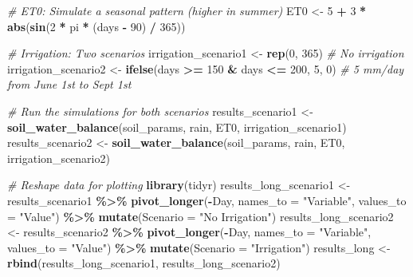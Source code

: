 \documentclass[
]{book}
\newenvironment{Shaded}{\begin{snugshade}}{\end{snugshade}}
\newcommand{\AttributeTok}[1]{\textcolor[rgb]{0.13,0.29,0.53}{#1}}
\newcommand{\CommentTok}[1]{\textcolor[rgb]{0.56,0.35,0.01}{\textit{#1}}}
\newcommand{\DecValTok}[1]{\textcolor[rgb]{0.00,0.00,0.81}{#1}}
\newcommand{\FunctionTok}[1]{\textcolor[rgb]{0.13,0.29,0.53}{\textbf{#1}}}
\newcommand{\NormalTok}[1]{#1}
\newcommand{\OtherTok}[1]{\textcolor[rgb]{0.56,0.35,0.01}{#1}}
\newcommand{\SpecialCharTok}[1]{\textcolor[rgb]{0.81,0.36,0.00}{\textbf{#1}}}
\newcommand{\StringTok}[1]{\textcolor[rgb]{0.31,0.60,0.02}{#1}}
\theoremstyle{definition}
\theoremstyle{definition}
\theoremstyle{definition}
\theoremstyle{definition}
\theoremstyle{remark}
\begin{document}
\begin{Shaded}
\begin{Highlighting}[]
\CommentTok{\# ET0: Simulate a seasonal pattern (higher in summer)}
\NormalTok{ET0 }\OtherTok{\textless{}{-}} \DecValTok{5} \SpecialCharTok{+} \DecValTok{3} \SpecialCharTok{*} \FunctionTok{abs}\NormalTok{(}\FunctionTok{sin}\NormalTok{(}\DecValTok{2} \SpecialCharTok{*}\NormalTok{ pi }\SpecialCharTok{*}\NormalTok{ (days }\SpecialCharTok{{-}} \DecValTok{90}\NormalTok{) }\SpecialCharTok{/} \DecValTok{365}\NormalTok{)) }

\CommentTok{\# Irrigation: Two scenarios}
\NormalTok{irrigation\_scenario1 }\OtherTok{\textless{}{-}} \FunctionTok{rep}\NormalTok{(}\DecValTok{0}\NormalTok{, }\DecValTok{365}\NormalTok{)  }\CommentTok{\# No irrigation}
\NormalTok{irrigation\_scenario2 }\OtherTok{\textless{}{-}} \FunctionTok{ifelse}\NormalTok{(days }\SpecialCharTok{\textgreater{}=} \DecValTok{150} \SpecialCharTok{\&}\NormalTok{ days }\SpecialCharTok{\textless{}=} \DecValTok{200}\NormalTok{, }\DecValTok{5}\NormalTok{, }\DecValTok{0}\NormalTok{)  }\CommentTok{\# 5 mm/day from June 1st to Sept 1st}

\CommentTok{\# Run the simulations for both scenarios}
\NormalTok{results\_scenario1 }\OtherTok{\textless{}{-}} \FunctionTok{soil\_water\_balance}\NormalTok{(soil\_params, rain, ET0, irrigation\_scenario1)}
\NormalTok{results\_scenario2 }\OtherTok{\textless{}{-}} \FunctionTok{soil\_water\_balance}\NormalTok{(soil\_params, rain, ET0, irrigation\_scenario2)}
\end{Highlighting}
\end{Shaded}

\begin{Shaded}
\begin{Highlighting}[]
\CommentTok{\# Reshape data for plotting}
\FunctionTok{library}\NormalTok{(tidyr)}
\NormalTok{results\_long\_scenario1 }\OtherTok{\textless{}{-}}\NormalTok{ results\_scenario1 }\SpecialCharTok{\%\textgreater{}\%}
  \FunctionTok{pivot\_longer}\NormalTok{(}\SpecialCharTok{{-}}\NormalTok{Day, }\AttributeTok{names\_to =} \StringTok{"Variable"}\NormalTok{, }\AttributeTok{values\_to =} \StringTok{"Value"}\NormalTok{) }\SpecialCharTok{\%\textgreater{}\%}
  \FunctionTok{mutate}\NormalTok{(}\AttributeTok{Scenario =} \StringTok{"No Irrigation"}\NormalTok{)}
\NormalTok{results\_long\_scenario2 }\OtherTok{\textless{}{-}}\NormalTok{ results\_scenario2 }\SpecialCharTok{\%\textgreater{}\%}
  \FunctionTok{pivot\_longer}\NormalTok{(}\SpecialCharTok{{-}}\NormalTok{Day, }\AttributeTok{names\_to =} \StringTok{"Variable"}\NormalTok{, }\AttributeTok{values\_to =} \StringTok{"Value"}\NormalTok{) }\SpecialCharTok{\%\textgreater{}\%}
  \FunctionTok{mutate}\NormalTok{(}\AttributeTok{Scenario =} \StringTok{"Irrigation"}\NormalTok{)}
\NormalTok{results\_long }\OtherTok{\textless{}{-}} \FunctionTok{rbind}\NormalTok{(results\_long\_scenario1, results\_long\_scenario2)}
\end{Highlighting}
\end{Shaded}
\end{document}
